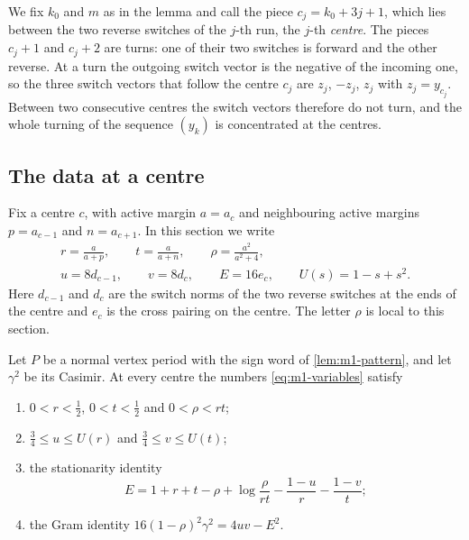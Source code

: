 We fix $k_0$ and $m$ as in the lemma and call the piece $c_j=k_0+3j+1$, which lies between the two
reverse switches of the $j$-th run, the $j$-th \emph{centre}. The pieces $c_j+1$ and $c_j+2$ are
turns: one of their two switches is forward and the other reverse. At a turn the outgoing switch
vector is the negative of the incoming one, so the three switch vectors that follow the centre
$c_j$ are $z_j$, $-z_j$, $z_j$ with $z_j=y_{c_j}$. Between two consecutive centres the switch
vectors therefore do not turn, and the whole turning of the sequence $(y_k)$ is concentrated at
the centres.

\subsection{The data at a centre}

Fix a centre $c$, with active margin $a=a_c$ and neighbouring active margins $p=a_{c-1}$ and
$n=a_{c+1}$. In this section we write
\begin{equation}\label{eq:m1-variables}
  \begin{gathered}
    r=\frac a{a+p},\qquad t=\frac a{a+n},\qquad \rho=\frac{a^2}{a^2+4},\\
    u=8d_{c-1},\qquad v=8d_c,\qquad E=16e_c,\qquad U(s)=1-s+s^2.
  \end{gathered}
\end{equation}
Here $d_{c-1}$ and $d_c$ are the switch norms of the two reverse switches at the ends of the
centre and $e_c$ is the cross pairing on the centre. The letter $\rho$ is local to this section.

\begin{lemma}\label{lem:m1-centre-data}
  Let $P$ be a normal vertex period with the sign word of \cref{lem:m1-pattern}, and let $\gamma^2$
  be its Casimir. At every centre the numbers \eqref{eq:m1-variables} satisfy
  \begin{enumerate}[label=\textup{(\roman*)}]
    \item $0<r<\tfrac12$, $0<t<\tfrac12$ and $0<\rho<rt$;
    \item $\tfrac34\le u\le U(r)$ and $\tfrac34\le v\le U(t)$;
    \item the stationarity identity
    \begin{equation}\label{eq:m1-stat}
      E=1+r+t-\rho+\log\frac{\rho}{rt}-\frac{1-u}r-\frac{1-v}t;
    \end{equation}
    \item the Gram identity $16(1-\rho)^2\gamma^2=4uv-E^2$.
  \end{enumerate}
\end{lemma}

